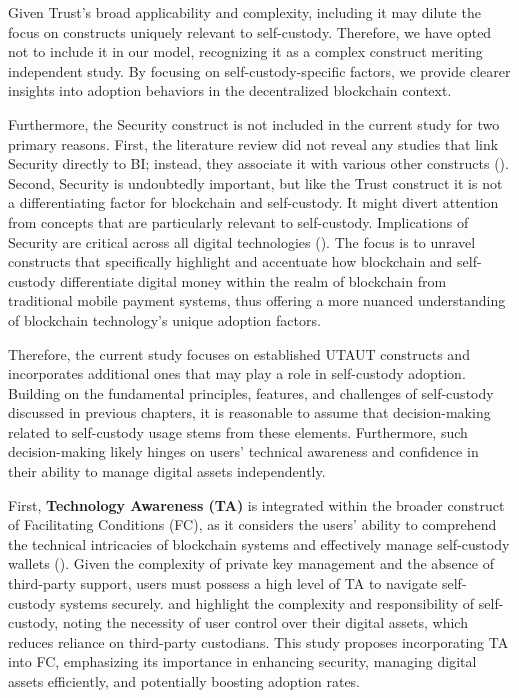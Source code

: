 \documentclass[twocolumn]{article}
\begin{document}
Given Trust's broad applicability and complexity, including it may dilute the focus on constructs uniquely relevant to self-custody. Therefore, we have opted not to include it in our model, recognizing it as a complex construct meriting independent study. By focusing on self-custody-specific factors, we provide clearer insights into adoption behaviors in the decentralized blockchain context.

Furthermore, the Security construct is not included in the current study for two primary reasons. First, the literature review did not reveal any studies that link Security directly to BI; instead, they associate it with various other constructs (\cite{baltruschat_user_2023, radic_you_2022, chang_acceptance_2022}). Second, Security is undoubtedly important, but like the Trust construct it is not a differentiating factor for blockchain and self-custody. It might divert attention from concepts that are particularly relevant to self-custody. Implications of Security are critical across all digital technologies (\cite{cimperman_analyzing_2016, khalilzadeh_security-related_2017, widyanto_safety_2022}). The focus is to unravel constructs that specifically highlight and accentuate how blockchain and self-custody differentiate digital money within the realm of blockchain from traditional mobile payment systems, thus offering a more nuanced understanding of blockchain technology's unique adoption factors.

Therefore, the current study focuses on established UTAUT constructs and incorporates additional ones that may play a role in self-custody adoption. Building on the fundamental principles, features, and challenges of self-custody discussed in previous chapters, it is reasonable to assume that decision-making related to self-custody usage stems from these elements. Furthermore, such decision-making likely hinges on users' technical awareness and confidence in their ability to manage digital assets independently. 

First, \textbf{Technology Awareness (TA)} is integrated within the broader construct of Facilitating Conditions (FC), as it considers the users' ability to comprehend the technical intricacies of blockchain systems and effectively manage self-custody wallets (\cite{abubakar_moderating_2013}). Given the complexity of private key management and the absence of third-party support, users must possess a high level of TA to navigate self-custody systems securely. \textcite{kaal_custody_2021} and \textcite{jaroucheh_crypto_2023} highlight the complexity and responsibility of self-custody, noting the necessity of user control over their digital assets, which reduces reliance on third-party custodians. This study proposes incorporating TA into FC, emphasizing its importance in enhancing security, managing digital assets efficiently, and potentially boosting adoption rates.
\end{document}
